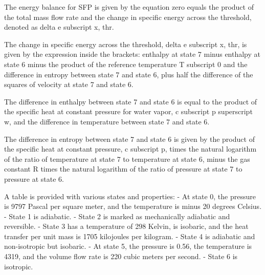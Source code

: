 The energy balance for SFP is given by the equation zero equals the product of the total mass flow rate and the change in specific energy across the threshold, denoted as delta e subscript x, thr.

The change in specific energy across the threshold, delta e subscript x, thr, is given by the expression inside the brackets: enthalpy at state 7 minus enthalpy at state 6 minus the product of the reference temperature T subscript 0 and the difference in entropy between state 7 and state 6, plus half the difference of the squares of velocity at state 7 and state 6.

The difference in enthalpy between state 7 and state 6 is equal to the product of the specific heat at constant pressure for water vapor, c subscript p superscript w, and the difference in temperature between state 7 and state 6.

The difference in entropy between state 7 and state 6 is given by the product of the specific heat at constant pressure, c subscript p, times the natural logarithm of the ratio of temperature at state 7 to temperature at state 6, minus the gas constant R times the natural logarithm of the ratio of pressure at state 7 to pressure at state 6.

A table is provided with various states and properties:
- At state 0, the pressure is 9797 Pascal per square meter, and the temperature is minus 20 degrees Celsius.
- State 1 is adiabatic.
- State 2 is marked as mechanically adiabatic and reversible.
- State 3 has a temperature of 298 Kelvin, is isobaric, and the heat transfer per unit mass is 1705 kilojoules per kilogram.
- State 4 is adiabatic and non-isotropic but isobaric.
- At state 5, the pressure is 0.56, the temperature is 4319, and the volume flow rate is 220 cubic meters per second.
- State 6 is isotropic.